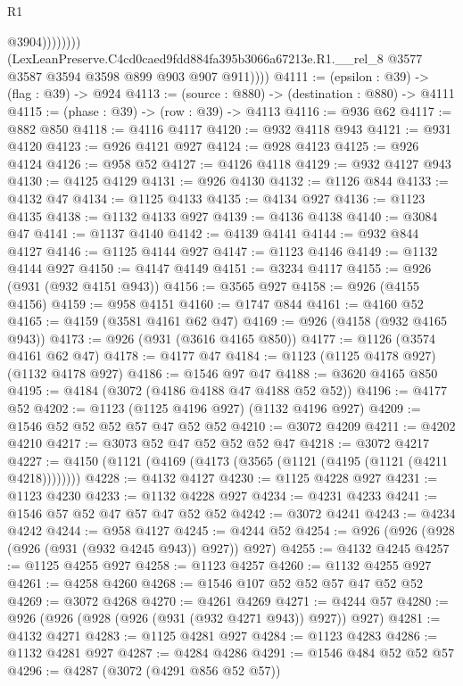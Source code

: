 \begin{lexlean}{R1}
\begin{coremodule}
                          @3904))))))))
          (LexLeanPreserve.C4cd0caed9fdd884fa395b3066a67213e.R1.__rel_8
            @3577
            @3587
            @3594
            @3598
            @899
            @903
            @907
            @911))))
@4111 := (epsilon : @39) -> (flag : @39) -> @924
@4113 := (source : @880) -> (destination : @880) -> @4111
@4115 := (phase : @39) -> (row : @39) -> @4113
@4116 := @936 @62
@4117 := @882 @850
@4118 := @4116 @4117
@4120 := @932 @4118 @943
@4121 := @931 @4120
@4123 := @926 @4121 @927
@4124 := @928 @4123
@4125 := @926 @4124
@4126 := @958 @52
@4127 := @4126 @4118
@4129 := @932 @4127 @943
@4130 := @4125 @4129
@4131 := @926 @4130
@4132 := @1126 @844
@4133 := @4132 @47
@4134 := @1125 @4133
@4135 := @4134 @927
@4136 := @1123 @4135
@4138 := @1132 @4133 @927
@4139 := @4136 @4138
@4140 := @3084 @47
@4141 := @1137 @4140
@4142 := @4139 @4141
@4144 := @932 @844 @4127
@4146 := @1125 @4144 @927
@4147 := @1123 @4146
@4149 := @1132 @4144 @927
@4150 := @4147 @4149
@4151 := @3234 @4117
@4155 := @926 (@931 (@932 @4151 @943))
@4156 := @3565 @927
@4158 := @926 (@4155 @4156)
@4159 := @958 @4151
@4160 := @1747 @844
@4161 := @4160 @52
@4165 := @4159 (@3581 @4161 @62 @47)
@4169 := @926 (@4158 (@932 @4165 @943))
@4173 := @926 (@931 (@3616 @4165 @850))
@4177 := @1126 (@3574 @4161 @62 @47)
@4178 := @4177 @47
@4184 := @1123 (@1125 @4178 @927) (@1132 @4178 @927)
@4186 := @1546 @97 @47
@4188 := @3620 @4165 @850
@4195 := @4184 (@3072 (@4186 @4188 @47 @4188 @52 @52))
@4196 := @4177 @52
@4202 := @1123 (@1125 @4196 @927) (@1132 @4196 @927)
@4209 := @1546 @52 @52 @52 @57 @47 @52 @52
@4210 := @3072 @4209
@4211 := @4202 @4210
@4217 := @3073 @52 @47 @52 @52 @52 @47
@4218 := @3072 @4217
@4227 := @4150 (@1121 (@4169 (@4173 (@3565 (@1121 (@4195 (@1121 (@4211 @4218))))))))
@4228 := @4132 @4127
@4230 := @1125 @4228 @927
@4231 := @1123 @4230
@4233 := @1132 @4228 @927
@4234 := @4231 @4233
@4241 := @1546 @57 @52 @47 @57 @47 @52 @52
@4242 := @3072 @4241
@4243 := @4234 @4242
@4244 := @958 @4127
@4245 := @4244 @52
@4254 := @926 (@926 (@928 (@926 (@931 (@932 @4245 @943)) @927)) @927)
@4255 := @4132 @4245
@4257 := @1125 @4255 @927
@4258 := @1123 @4257
@4260 := @1132 @4255 @927
@4261 := @4258 @4260
@4268 := @1546 @107 @52 @52 @57 @47 @52 @52
@4269 := @3072 @4268
@4270 := @4261 @4269
@4271 := @4244 @57
@4280 := @926 (@926 (@928 (@926 (@931 (@932 @4271 @943)) @927)) @927)
@4281 := @4132 @4271
@4283 := @1125 @4281 @927
@4284 := @1123 @4283
@4286 := @1132 @4281 @927
@4287 := @4284 @4286
@4291 := @1546 @484 @52 @52 @57
@4296 := @4287 (@3072 (@4291 @856 @52 @57))

\end{coremodule}
\end{lexlean}
